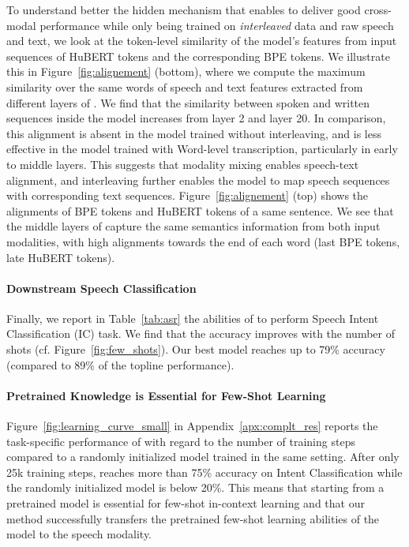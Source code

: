 To understand better the hidden mechanism that enables \spot to deliver good cross-modal performance while only being trained on \textit{interleaved} data and raw speech and text, 
we look at the token-level similarity of the model's features from input sequences of HuBERT tokens and the corresponding BPE tokens. 
We illustrate this in Figure~\ref{fig:alignement} (bottom), where we compute the maximum similarity over the same words of speech and text features extracted from different layers of \spot. We find that the similarity between spoken and written sequences inside the model increases from layer 2 and layer 20. In comparison, this alignment is absent in the model trained without interleaving, and is less effective in the model trained with Word-level transcription, particularly in early to middle layers. This suggests that modality mixing enables speech-text alignment, and interleaving further enables the model to map speech sequences with corresponding text sequences.
Figure~\ref{fig:alignement} (top) shows the alignments of BPE tokens and HuBERT tokens of a same sentence.
We see that the middle layers of \spot capture the same semantics information from both input modalities, with high alignments towards the end of each word (last BPE tokens, late HuBERT tokens).

\paragraph{Downstream Speech Classification}
Finally, we report in  Table~\ref{tab:asr} the abilities of \spot to perform Speech Intent Classification (IC) task. We find that the accuracy improves with the number of shots (cf. Figure~\ref{fig:few_shots}). Our best \spot model reaches up to 79\% accuracy (compared to 89\% of the topline performance). 

\paragraph{Pretrained Knowledge is Essential for Few-Shot Learning}

Figure~\ref{fig:learning_curve_small} in Appendix~\ref{apx:complt_res} reports the task-specific performance of \spotbase with regard to the number of training steps compared to a randomly initialized model trained in the same setting. 
After only 25k training steps, \spotbase reaches more than 75\% accuracy on Intent Classification while the randomly initialized model is below 20\%. This means that starting from a pretrained \llamatwo model is essential for few-shot in-context learning and that our method successfully transfers the pretrained few-shot learning abilities of the model to the speech modality.  

